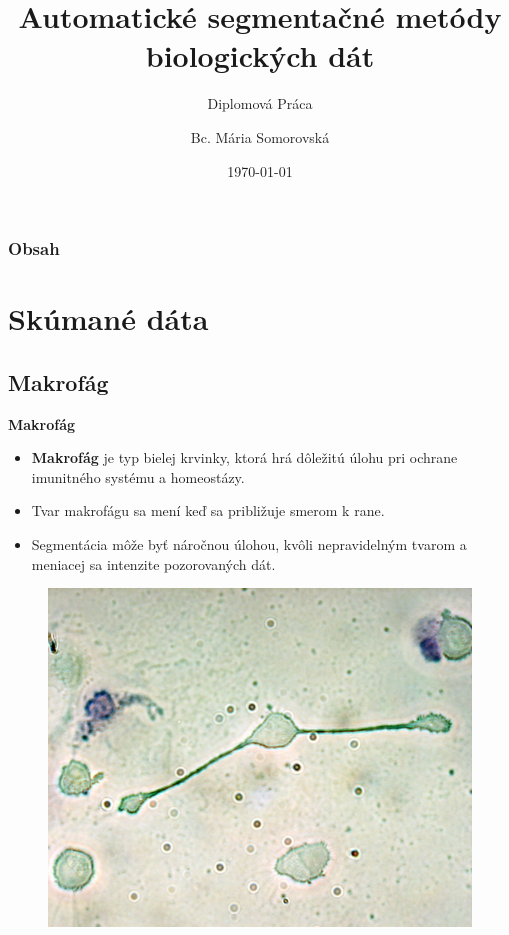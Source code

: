 \documentclass{beamer}
\author{Bc. Mária Somorovská}
\title{\textbf{Automatické segmentačné metódy biologických dát}}
\subtitle{Diplomová Práca}
\institute[STU] %
{
  Vedúca práce: doc. RNDr. Zuzana Krivá, PhD. \\
  Matematicko-Počítačové Modelovanie\\
  Slovenská Technická Univerzita v Bratislave
}
\date{\today}
\begin{document}
\frame{\maketitle}

\begin{frame}
\frametitle{Obsah}
  \tableofcontents
  \end{frame}



\section{Skúmané dáta}


\subsection{Makrofág}
\begin{frame}{\textbf{Makrofág}}
	\begin{itemize}
	\item \textbf{Makrofág} je typ bielej krvinky, ktorá hrá dôležitú úlohu pri
ochrane imunitného systému a homeostázy.
	\item Tvar makrofágu sa mení keď sa približuje smerom k rane.
	\item Segmentácia môže byť náročnou úlohou, kvôli nepravidelným tvarom a meniacej sa intenzite pozorovaných dát.
	\end{itemize}
	\begin{figure}
	\centering
      \includegraphics[width= 0.45 \textwidth]{img1.jpg} 
	\end{figure}
\end{frame}
\end{document}
